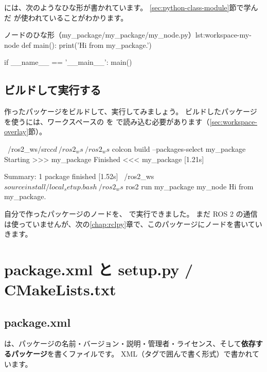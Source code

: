  には、次のようなひな形が書かれています。
\ref{sec:python-class-module}節で学んだ  が使われていることがわかります。

\begin{codelisting}[style=python]{ノードのひな形（my\_package/my\_package/my\_node.py）}{lst:workspace-my-node}
def main():
    print('Hi from my_package.')


if __name__ == '__main__':
    main()
\end{codelisting}

\subsection{ビルドして実行する}

作ったパッケージをビルドして、実行してみましょう。
ビルドしたパッケージを使うには、ワークスペースの  を  で読み込む必要があります（\ref{sec:workspace-overlay}節）。

\begin{terminal}[パッケージをビルドして実行する]
~/ros2_ws/src$ cd ~/ros2_ws
~/ros2_ws$ colcon build --packages-select my_package
Starting >>> my_package
Finished <<< my_package [1.21s]

Summary: 1 package finished [1.52s]
~/ros2_ws$ source install/local_setup.bash
~/ros2_ws$ ros2 run my_package my_node
Hi from my_package.
\end{terminal}

自分で作ったパッケージのノードを、 で実行できました。
まだ ROS 2 の通信は使っていませんが、次の\ref{chap:rclpy}章で、このパッケージにノードを書いていきます。

\section{package.xml と setup.py / CMakeLists.txt}
\label{sec:workspace-files}

\subsection{package.xml}

 は、パッケージの名前・バージョン・説明・管理者・ライセンス、そして\textbf{依存するパッケージ}を書くファイルです。
XML（タグで囲んで書く形式）で書かれています。

